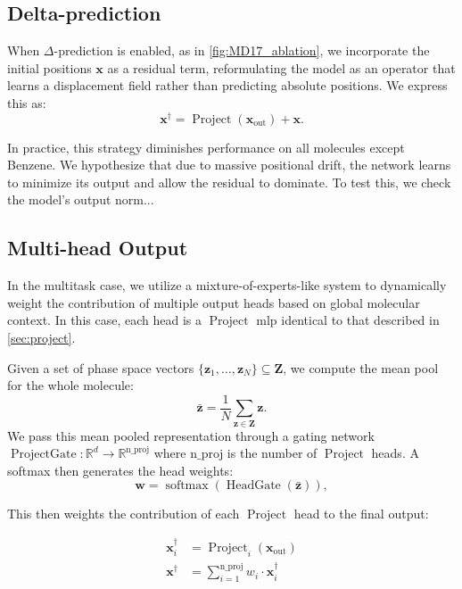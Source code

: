 \subsection{Delta-prediction}
\label{sec:delta_prediction}
When \(\Delta\)-prediction is enabled, as in \cref{fig:MD17_ablation}, we incorporate the initial positions \(\mathbf{x}\) as a residual term, reformulating the model as an operator that learns a displacement field rather than predicting absolute positions. We express this as:
\begin{equation}
    \mathbf{x}^\dagger = \operatorname{Project}(\mathbf{x}_{\text{out}}) + \mathbf{x}.
\end{equation}


In practice, this strategy diminishes performance on all molecules except Benzene. We hypothesize that due to massive positional drift, the network learns to minimize its output and allow the residual to dominate. To test this, we check the model's output norm...

\subsection{Multi-head Output}
\label{sec:multi_head_output}
In the multitask case, we utilize a mixture-of-experts-like system to dynamically weight the contribution of multiple output heads based on global molecular context. In this case, each head is a \(\operatorname{Project}\) \gls{mlp} identical to that described in \cref{sec:project}.

Given a set of phase space vectors \(\{ \mathbf{z}_1, \dots, \mathbf{z}_N \} \subseteq \mathbf{Z} \), we compute the mean pool for the whole molecule:
\begin{equation}
    \bar{\mathbf{z}} = \frac{1}{N} \sum\limits_{\mathbf{z} \in \mathbf{Z}} \mathbf{z}.
\end{equation}
We pass this mean pooled representation through a gating network \(\operatorname{ProjectGate} \colon \mathbb{R}^d \to \mathbb{R}^{\text{n\_proj}}\) where \(\text{n\_proj}\) is the number of \(\operatorname{Project}\) heads. A softmax then generates the head weights:
\begin{equation}
    \mathbf{w} = \operatorname{softmax}(\operatorname{HeadGate}(\bar{\mathbf{z}})),
\end{equation}

This then weights the contribution of each \(\operatorname{Project}\) head to the final output:

\begin{align}
    \mathbf{x}_i^\dagger& = \operatorname{Project}_i(\mathbf{x}_\text{out})
    \\
    \mathbf{x}^\dagger &= \sum\limits_{i=1}^{\text{n\_proj}} w_i \cdot \mathbf{x}_i^\dagger
\end{align}

